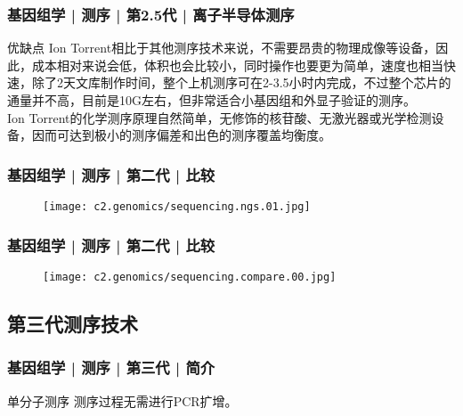 \begin{frame}
  \frametitle{基因组学 | 测序 | 第2.5代 | 离子半导体测序}
  \begin{block}{优缺点}
Ion Torrent相比于其他测序技术来说，不需要昂贵的物理成像等设备，因此，成本相对来说会低，体积也会比较小，同时操作也要更为简单，速度也相当快速，除了2天文库制作时间，整个上机测序可在2-3.5小时内完成，不过整个芯片的通量并不高，目前是10G左右，但非常适合小基因组和外显子验证的测序。\\
\vspace{1em}
Ion Torrent的化学测序原理自然简单，无修饰的核苷酸、无激光器或光学检测设备，因而可达到极小的测序偏差和出色的测序覆盖均衡度。
  \end{block}
\end{frame}



\begin{frame}
  \frametitle{基因组学 | 测序 | 第二代 | 比较}
  \begin{figure}
    \centering
    \texttt{[image: c2.genomics/sequencing.ngs.01.jpg]}
  \end{figure}
\end{frame}

\begin{frame}
  \frametitle{基因组学 | 测序 | 第二代 | 比较}
  \begin{figure}
    \centering
    \texttt{[image: c2.genomics/sequencing.compare.00.jpg]}
  \end{figure}
\end{frame}

\subsection{第三代测序技术}
\begin{frame}
  \frametitle{基因组学 | 测序 | 第三代 | 简介}
  \begin{block}{单分子测序}
测序过程无需进行PCR扩增。 
  \end{block}
\end{frame}

